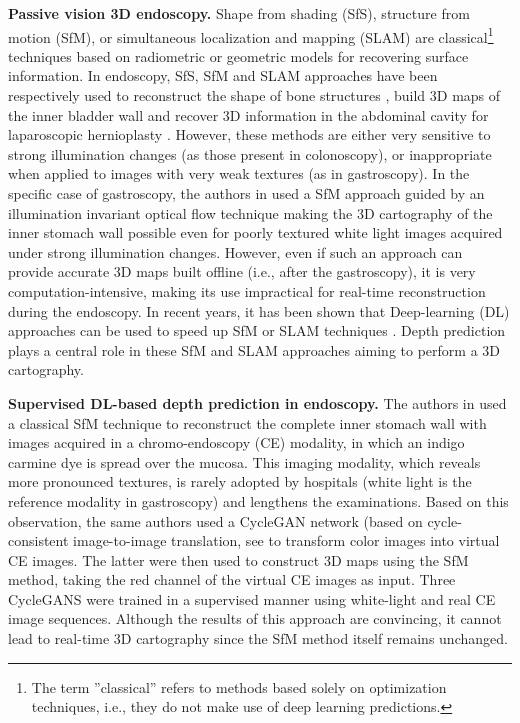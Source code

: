 \documentclass[a4paper,fleqn]{cas-dc}
\begin{document}
\textbf{Passive vision 3D endoscopy.} Shape from shading (SfS), structure from motion (SfM), or simultaneous localization and mapping (SLAM) are classical\footnote{The term ''classical'' refers to methods based solely on optimization techniques, i.e., they do not make use of deep learning predictions.} techniques based on radiometric or geometric models for recovering surface information. In endoscopy, SfS, SfM and SLAM approaches have been respectively used to reconstruct the shape of bone structures \citep{Wu_IJCV_2010}, build 3D maps of the inner bladder wall \citep{Lurie_BOE_2017, Groenius_IJCARS_2023} and recover 3D information in the abdominal cavity for laparoscopic hernioplasty \citep{Grasa_TMI_2014}. However, these methods are either very sensitive to strong illumination changes (as those present in colonoscopy), or inappropriate when applied to images with very weak textures (as in gastroscopy). In the specific case of gastroscopy, the authors in \citep{Phan_ICIP_2019} used a SfM approach guided by an illumination invariant optical flow technique \citep{Trinh_CVIU_2019} making the 3D cartography of the inner stomach wall possible even for poorly textured white light images acquired under strong illumination changes. However, even if such an approach can provide accurate 3D maps built offline (i.e., after the gastroscopy), it is very computation-intensive, making its use impractical for real-time reconstruction during the endoscopy. In recent years, it has been shown that Deep-learning (DL) approaches can be used to speed up SfM or SLAM techniques \citep{chen_CMPB_2018}. Depth prediction plays a central role in these SfM and SLAM approaches aiming to perform a 3D cartography. 

%
\textbf{Supervised DL-based depth prediction in endoscopy.}
%
The authors in \citep{Widya_JTEHM_2019} used a classical SfM technique to reconstruct the complete inner stomach wall with images acquired in a chromo-endoscopy (CE) modality, in which an indigo carmine dye is spread over the mucosa. This imaging modality, which reveals more pronounced textures, is rarely adopted by hospitals (white light is the reference modality in gastroscopy) and lengthens the examinations. Based on this observation, the same authors \citep{Widya_JTEHM_2021} used a CycleGAN network (based on cycle-consistent image-to-image translation, see \citep{Zhu_ICCV_2017} to transform color images into virtual CE images. The latter were then used to construct 3D maps using the SfM method, taking the red channel of the virtual CE images as input. Three CycleGANS were trained in a supervised manner using white-light and real CE image sequences. Although the results of this approach are convincing, it cannot lead to real-time 3D cartography since the SfM method itself remains unchanged.   
\end{document}
